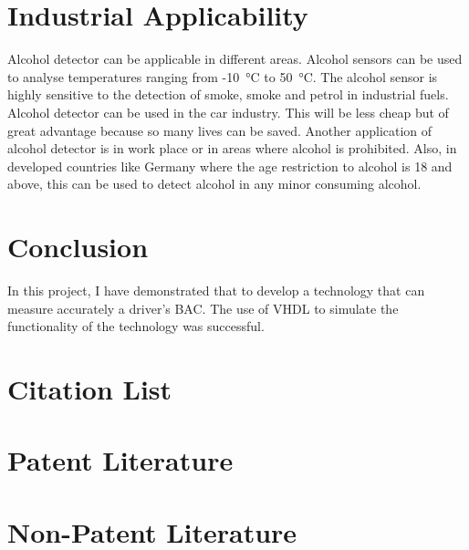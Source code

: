 \documentclass[12pt]{article}
\begin{document}
\section{Industrial Applicability}
Alcohol detector can be applicable in different areas. Alcohol sensors can be used to analyse temperatures ranging from -10 °C to 50 °C. The alcohol sensor is highly sensitive to the detection of smoke, smoke and petrol in industrial fuels\cite{a8}.
Alcohol detector can be used in the car industry. This will be less cheap but of great advantage because so many lives can be saved.
Another application of alcohol detector is in work place or in areas where alcohol is prohibited. Also, in developed countries like Germany where the age restriction to alcohol is 18 and above, this can be used to detect alcohol in any minor consuming alcohol.

\section{Conclusion}
In this project, I have demonstrated that to develop a technology that can measure accurately a driver’s BAC. The use of VHDL to simulate the functionality of the technology was successful.

\newpage
\section{Citation List}
\listoffigures
\section{Patent Literature}
\section{Non-Patent Literature}
\cite{a9}
\cite{a10}


\end{document}
